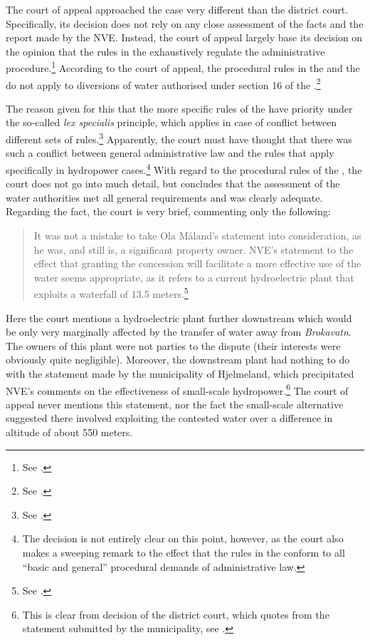 The court of appeal approached the case very different than the district court. Specifically, its decision does not rely on any close assessment of the facts and the report made by the NVE. Instead, the court of appeal largely base its decision on the opinion that the rules in the \cite{wra17} exhaustively regulate the administrative procedure.\footnote{See \cite[7]{jorpeland11a}.} According to the court of appeal, the procedural rules in the \cite{ea59} and the \cite{paa67} do not apply to diversions of water authorised under section 16 of the \cite{wra17}.\footnote{See \cite[7]{jorpeland11a}.} 

The reason given for this that the more specific rules of the \cite{wra17} have priority under the so-called {\it lex specialis} principle, which applies in case of conflict between different sets of rules.\footnote{See \cite[7]{jorpeland11a}.} Apparently, the court must have thought that there was such a conflict between general administrative law and the rules that apply specifically in hydropower cases.\footnote{The decision is not entirely clear on this point, however, as the court also makes a sweeping remark to the effect that the rules in the \cite{wra17} conform to all ``basic and general'' procedural demands of administrative law.} With regard to the procedural rules of the \cite{wra17}, the court does not go into much detail, but concludes that the assessment of the water authorities met all general requirements and was clearly adequate. Regarding the fact, the court is very brief, commenting only the following:

\begin{quote} It was not a mistake to take Ola Måland's statement into consideration, as he was, and still is, a significant property owner. NVE's statement to the effect that granting the concession will facilitate a more effective use of the water seems appropriate, as it refers to a current hydroelectric plant that exploits a waterfall of 13.5 meters.\footnote{See \cite[8]{jorpeland11a}.}
\end{quote}

Here the court mentions a hydroelectric plant further downstream which would be only very marginally affected by the transfer of water away from {\it Brokavatn}. The owners of this plant were not parties to the dispute (their interests were obviously quite negligible). Moreover, the downstream plant had nothing to do with the statement made by the municipality of Hjelmeland, which precipitated NVE's comments on the effectiveness of small-scale hydropower.\footnote{This is clear from decision of the  district court, which quotes from the statement submitted by the municipality, see \cite[16]{jorpeland09}.} The court of appeal never mentions this statement, nor the fact the small-scale alternative suggested there involved exploiting the contested water over a difference in altitude of about 550 meters.


